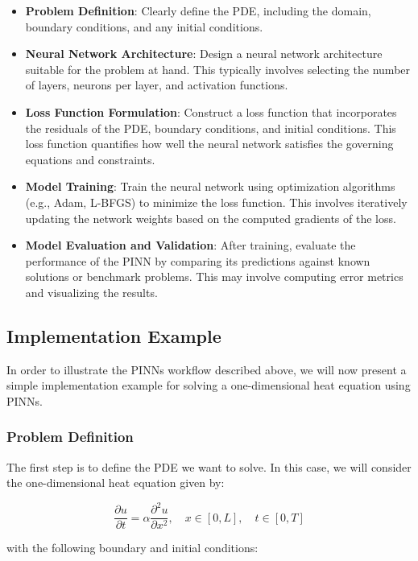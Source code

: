 \documentclass[final,1p,times]{elsarticle}
\theoremstyle{definition}
\begin{document}
\begin{itemize}
  \item \textbf{Problem Definition}: Clearly define the PDE, including the domain, boundary conditions, and any initial conditions.
  \item \textbf{Neural Network Architecture}: Design a neural network architecture suitable for the problem at hand. This typically involves selecting the number of layers, neurons per layer, and activation functions.
  \item \textbf{Loss Function Formulation}: Construct a loss function that incorporates the residuals of the PDE, boundary conditions, and initial conditions. This loss function quantifies how well the neural network satisfies the governing equations and constraints.
  \item \textbf{Model Training}: Train the neural network using optimization algorithms (e.g., Adam, L-BFGS) to minimize the loss function. This involves iteratively updating the network weights based on the computed gradients of the loss.
  \item \textbf{Model Evaluation and Validation}: After training, evaluate the performance of the PINN by comparing its predictions against known solutions or benchmark problems. This may involve computing error metrics and visualizing the results.
\end{itemize}

\subsection{Implementation Example}

In order to illustrate the PINNs workflow described above, we will now present a simple implementation example for solving a one-dimensional heat equation using PINNs.

\subsubsection{Problem Definition}

The first step is to define the PDE we want to solve. In this case, we will consider the one-dimensional heat equation given by:

\begin{equation}
\frac{\partial u}{\partial t} = \alpha \frac{\partial^2 u}{\partial x^2}, \quad x \in [0, L], \quad t \in [0, T]
\end{equation}

with the following boundary and initial conditions:
\end{document}
